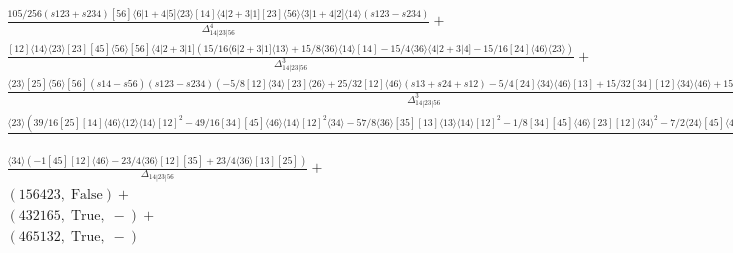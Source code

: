 \documentclass[varwidth, border=5pt]{standalone}
\begin{document}
\begin{my}
$\begin{gathered}
\scriptscriptstyle\frac{105/256(s123+s234)[56]⟨6|1+4|5]⟨23⟩[14]⟨4|2+3|1][23]⟨56⟩⟨3|1+4|2]⟨14⟩(s123-s234)}{Δ_{14|23|56}^4}+\\
\scriptscriptstyle\frac{[12]⟨14⟩⟨23⟩[23][45]⟨56⟩[56]⟨4|2+3|1](15/16⟨6|2+3|1]⟨13⟩+15/8⟨36⟩⟨14⟩[14]-15/4⟨36⟩⟨4|2+3|4]-15/16[24]⟨46⟩⟨23⟩)}{Δ_{14|23|56}^3}+\\
\scriptscriptstyle\frac{⟨23⟩[25]⟨56⟩[56](s14-s56)(s123-s234)(-5/8[12]⟨34⟩[23]⟨26⟩+25/32[12]⟨46⟩(s13+s24+s12)-5/4[24]⟨34⟩⟨46⟩[13]+15/32[34][12]⟨34⟩⟨46⟩+15/16⟨6|2+3|1]⟨14⟩[12])}{Δ_{14|23|56}^3}+\\
\scriptscriptstyle\frac{⟨23⟩(39/16[25][14]⟨46⟩⟨12⟩⟨14⟩[12]^2-49/16[34][45]⟨46⟩⟨14⟩[12]^2⟨34⟩-57/8⟨36⟩[35][13]⟨13⟩⟨14⟩[12]^2-1/8[34][45]⟨46⟩[23][12]⟨34⟩^2-7/2⟨24⟩[45]⟨46⟩[23]⟨13⟩[12]^2-3/16[45][14]⟨46⟩⟨14⟩^2[12]^2-53/8[45]⟨46⟩⟨12⟩⟨14⟩[12]^3-29/4[13][45]⟨46⟩⟨13⟩⟨14⟩[12]^2+33/16⟨14⟩^2[12]^3[45]⟨26⟩+33/16⟨36⟩[13][45]⟨14⟩^2[12]^2-3/4⟨36⟩[35][14]⟨14⟩^2[12]^2-5/8[35]⟨13⟩⟨26⟩⟨14⟩[12]^3+41/16[35][14]⟨46⟩⟨13⟩⟨14⟩[12]^2+47/8[35][13]⟨46⟩⟨13⟩^2[12]^2+7/16⟨16⟩[15][14]⟨14⟩^2[12]^2-57/16⟨16⟩[15]⟨12⟩⟨14⟩[12]^3-67/16[13]⟨16⟩[15]⟨13⟩⟨14⟩[12]^2-47/8[13]^2[25]⟨46⟩⟨13⟩^2[12]-1/8[25][13][14]⟨46⟩⟨13⟩⟨14⟩[12]+9/4[13][45]⟨46⟩[23]⟨13⟩[12]⟨34⟩-11/2⟨36⟩[13][45][23]^2⟨34⟩^2-11/2⟨36⟩⟨24⟩[45][23]^2[12]⟨34⟩+13/2⟨36⟩[25][13]^2⟨13⟩⟨14⟩[12]+3/4⟨36⟩[25][13][14]⟨14⟩^2[12]-3/8⟨23⟩[45]⟨46⟩[23]^2[12]⟨34⟩+23/4⟨36⟩[35][34][23][12]⟨34⟩^2-23/4⟨36⟩[35]⟨12⟩[23][12]^2⟨34⟩-49/16⟨24⟩[45]⟨46⟩[24]⟨14⟩[12]^2)}{Δ_{14|23|56}^2}+\\
\scriptscriptstyle\frac{⟨34⟩(-1[45][12]⟨46⟩-23/4⟨36⟩[12][35]+23/4⟨36⟩[13][25])}{Δ_{14|23|56}}+\\
\scriptscriptstyle(156423,\;\text{False})+\\
\scriptscriptstyle(432165,\;\text{True},\;-)+\\
\scriptscriptstyle(465132,\;\text{True},\;-)\phantom{+}
\end{gathered}$
\end{my}
\end{document}
